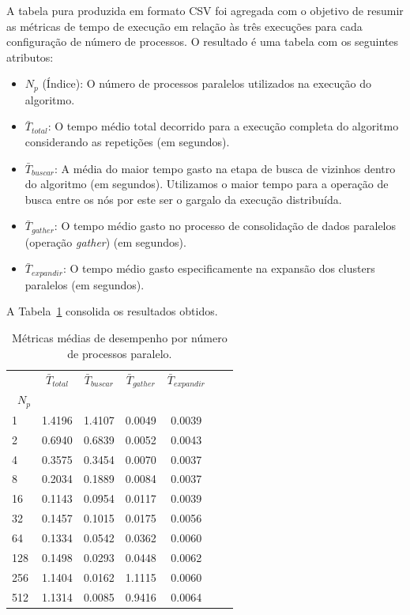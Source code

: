 \documentclass[a4paper,12pt]{article}
\begin{document}
A tabela pura produzida em formato CSV foi agregada com o objetivo de resumir as
métricas de tempo de execução em relação às três execuções para cada
configuração de número de processos. O resultado é uma tabela com os seguintes
atributos:

\begin{itemize}
    \item $N_p$ (Índice): O número de processos paralelos utilizados na execução
          do algoritmo.
    \item $\bar{T}_{total}$: O tempo médio total decorrido para a execução
          completa do algoritmo considerando as repetições (em segundos).
    \item $\bar{T}_{buscar}$: A média do maior tempo gasto na etapa de busca de
          vizinhos dentro do algoritmo (em segundos). Utilizamos o maior tempo
          para a operação de busca entre os nós por este ser o gargalo da
          execução distribuída.
    \item $\bar{T}_{gather}$: O tempo médio gasto no processo de consolidação de
          dados paralelos (operação \textit{gather}) (em segundos).
    \item $\bar{T}_{expandir}$: O tempo médio gasto especificamente na expansão
          dos clusters paralelos (em segundos).
\end{itemize}

A Tabela~\ref{tab:desempenho_processos} consolida os resultados obtidos.

\begin{table}[h]
    \centering
    \caption{Métricas médias de desempenho por número de processos paralelo.}
    \label{tab:desempenho_processos}
    \begin{tabular}{lcccccc}
        \toprule
        & $\bar{T}_{total}$ & $\bar{T}_{buscar}$ & $\bar{T}_{gather}$ &
        $\bar{T}_{expandir}$ \\
        \
        $N_p$ & & & & & & \\
        \midrule
        1 & 1.4196 & 1.4107 & 0.0049 & 0.0039 \\
        2 & 0.6940 & 0.6839 & 0.0052 & 0.0043 \\
        4 & 0.3575 & 0.3454 & 0.0070 & 0.0037 \\
        8 & 0.2034 & 0.1889 & 0.0084 & 0.0037 \\
        16 & 0.1143 & 0.0954 & 0.0117 & 0.0039 \\
        32 & 0.1457 & 0.1015 & 0.0175 & 0.0056 \\
        64 & 0.1334 & 0.0542 & 0.0362 & 0.0060 \\
        128 & 0.1498 & 0.0293 & 0.0448 & 0.0062 \\
        256 & 1.1404 & 0.0162 & 1.1115 & 0.0060 \\
        512 & 1.1314 & 0.0085 & 0.9416 & 0.0064 \\
        \bottomrule
    \end{tabular}
\end{table}
\end{document}
